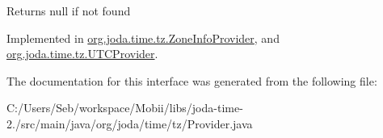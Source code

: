 \begin{DoxyReturn}{Returns}
null if not found 
\end{DoxyReturn}


Implemented in \hyperlink{classorg_1_1joda_1_1time_1_1tz_1_1_zone_info_provider_a663348ffdc65d429789505620a4c56a4}{org.\-joda.\-time.\-tz.\-Zone\-Info\-Provider}, and \hyperlink{classorg_1_1joda_1_1time_1_1tz_1_1_u_t_c_provider_a1a43542a28fa0542ba54047a796e7e43}{org.\-joda.\-time.\-tz.\-U\-T\-C\-Provider}.



The documentation for this interface was generated from the following file\-:\begin{DoxyCompactItemize}
\item 
C\-:/\-Users/\-Seb/workspace/\-Mobii/libs/joda-\/time-\/2./src/main/java/org/joda/time/tz/Provider.\-java\end{DoxyCompactItemize}

